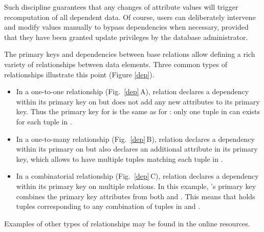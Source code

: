 Such discipline guarantees that any changes of attribute values will trigger recomputation of all dependent data. 
Of course, users can deliberately intervene and modify values manually to bypass dependencies when necessary, provided that they have been granted update privileges by the database administrator.

The primary keys and dependencies between base relations allow defining a rich variety of relationships between data elements.  
Three common types of relationships illustrate this point (Figure \ref{dep}). 



\begin{itemize}
\item
In a one-to-one relationship (Fig.\ \ref{dep}\,A), relation  declares a dependency within its primary key on  but does not add any new attributes to its primary key.
Thus the primary key for  is the same as for : only one tuple in  can exists for each tuple in .
\item
In a one-to-many relationship (Fig.\ \ref{dep}\,B), relation  declares a dependency within its primary on  but also declares an additional attribute  in its primary key, which allows  to have multiple tuples matching each tuple in .
\item
In a combinatorial relationship (Fig.\ \ref{dep}\,C), relation  declares a dependency within its primary key on  multiple relations.
In this example, 's primary key combines the primary key attributes from both  and .  
This means that  holds tuples corresponding to any combination of tuples in  and .
\end{itemize}
Examples of other types of relationships may be found in the online resources.
